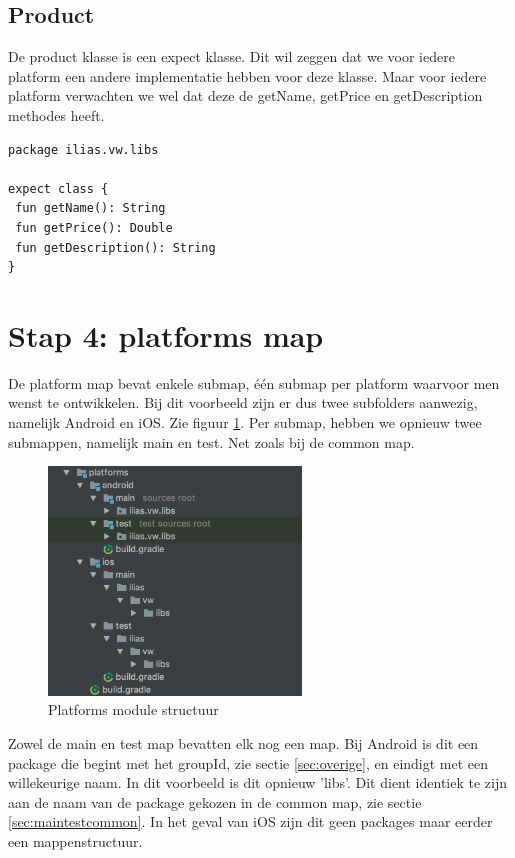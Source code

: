 \subsection{Product}
De product klasse is een expect klasse. Dit wil zeggen dat we voor iedere platform een andere implementatie hebben voor deze klasse. Maar voor iedere platform verwachten we wel dat deze de getName, getPrice en getDescription methodes heeft.

\begin{lstlisting}
package ilias.vw.libs

expect class {
 fun getName(): String
 fun getPrice(): Double
 fun getDescription(): String
}
\end{lstlisting}

\section{Stap 4: platforms map}
De platform map bevat enkele submap, één submap per platform waarvoor men wenst te ontwikkelen. Bij dit voorbeeld zijn er dus twee subfolders aanwezig, namelijk Android en iOS. Zie figuur \ref{fig:stap4-structuur}. Per submap, hebben we opnieuw twee submappen, namelijk main en test. Net zoals bij de common map. 

\begin{figure} [ht]
	\centering
	\includegraphics[width=0.60\textwidth]{img/stap4-structuur.png}
	\caption{Platforms module structuur}
	\label{fig:stap4-structuur}
\end{figure}

Zowel de main en test map bevatten elk nog een map. Bij Android is dit een package die begint met het groupId, zie sectie \ref{sec:overige}, en eindigt met een willekeurige naam. In dit voorbeeld is dit opnieuw 'libs'. Dit dient identiek te zijn aan de naam van de package gekozen in de common map, zie sectie \ref{sec:maintestcommon}. In het geval van iOS zijn dit geen packages maar eerder een mappenstructuur.

